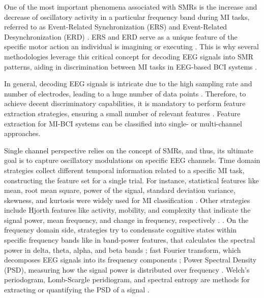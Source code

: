 One of the most important phenomena associated with SMRs is the increase and decrease of oscillatory activity in a particular frequency band during MI tasks, referred to as Event-Related Synchronization (ERS) and Event-Related Desynchronization (ERD) \cite{belwafi2020effective}. ERS and ERD serve as a unique feature of the specific motor action an individual is imagining or executing \cite{zapala2020effects}. This is why several methodologies leverage this critical concept for decoding EEG signals into SMR patterns, aiding in discrimination between MI tasks in EEG-based BCI systems \cite{brusini2021systematic}. 

In general, decoding EEG signals is intricate due to the high sampling rate and number of electrodes, leading to a huge number of data points \cite{singh2021comprehensive}. Therefore, to achieve decent discriminatory capabilities, it is mandatory to perform feature extraction strategies, ensuring a small number of relevant features \cite{ai2019feature}. Feature extraction for MI-BCI systems can be classified into single- or multi-channel approaches.

Single channel perspective relies on the concept of SMRs, and thus, its ultimate goal is to capture oscillatory modulations on specific EEG channels. Time domain strategies collect different temporal information related to a specific MI task, constructing the feature set for a single trial. For instance, statistical features like mean, root mean square, power of the signal, standard deviation variance, skewness, and kurtosis were widely used for MI classification \cite{samuel2017towards, hamedi2014neural}. Other strategies include Hjorth features like activity, mobility, and complexity that indicate the signal power, mean frequency, and change in frequency, respectively \cite{yilmaz2018quasi}.  \cite{batres2016quaternion}. On the frequency domain side, strategies try to condensate cognitive states within specific frequency bands like in band-power features, that calculates the spectral power in delta, theta, alpha, and beta bands \cite{luo2020motor}; fast Fourier transform, which decomposes EEG signals into its frequency components \cite{rashkov2019natural}; Power Spectral Density (PSD), measuring how the signal power is distributed over frequency \cite{oikonomou2017comparison}. Welch's periodogram, Lomb-Scargle peridiogram, and spectral entropy are methods for extracting or quantifying the PSD of a signal \cite{roy2022comparative, sarraf2017eeg, li2015feature}.

